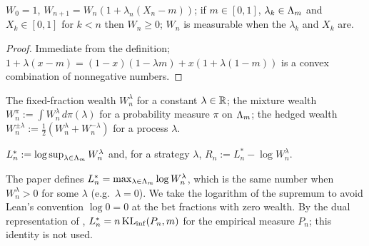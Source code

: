 \begin{lemma}
  \label{lem:wealth_basic}
  \leanok
  $W_0 = 1$, $W_{n+1} = W_n (1 + \lambda_n (X_n - m))$; if $m \in [0,1]$, $\lambda_k \in \Lambda_m$ and
  $X_k \in [0,1]$ for $k < n$ then $W_n \ge 0$; $W_n$ is measurable when the $\lambda_k$ and $X_k$
  are.
\end{lemma}

\begin{proof}
  \leanok
  Immediate from the definition; $1 + \lambda(x - m) = (1-x)(1 - \lambda m) + x(1 + \lambda(1-m))$ is
  a convex combination of nonnegative numbers.
\end{proof}

\begin{definition}
  \label{def:fixed_wealth}
  \leanok
  The fixed-fraction wealth $W^\lambda_n$ for a constant $\lambda \in \mathbb{R}$; the mixture wealth
  $W^\pi_n := \int W^\lambda_n \, d\pi(\lambda)$ for a probability measure $\pi$ on $\Lambda_m$; the hedged
  wealth $W^{\pm\lambda}_n := \frac12 (W^\lambda_n + W^{-\lambda}_n)$ for a process $\lambda$.
\end{definition}

\begin{definition}
  \label{def:hindsight}
  \leanok
  $L^*_n := \log \sup_{\lambda \in \Lambda_m} W^\lambda_n$ and, for a strategy $\lambda$,
  $R_n := L^*_n - \log W^\lambda_n$.
\end{definition}

\begin{remark}
  The paper defines $L^*_n = \max_{\lambda \in \Lambda_m} \log W^\lambda_n$, which is the same number
  when $W^\lambda_n > 0$ for some $\lambda$ (e.g.\ $\lambda = 0$). We take the logarithm of the
  supremum to avoid Lean's convention $\log 0 = 0$ at the bet fractions with zero wealth. By the
  dual representation of \cite{honda2010asymptotically}, $L^*_n = n \operatorname{KL}_{\inf}(P_n, m)$ for the
  empirical measure $P_n$; this identity is not used.
\end{remark}

